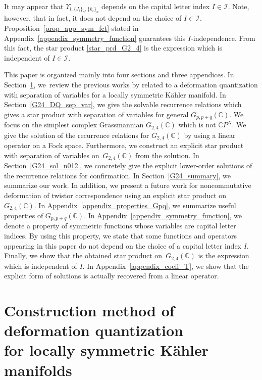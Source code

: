 \documentclass[pdftex]{sigma}
\numberwithin{equation}{section}
\begin{document}
It may appear that
$\Upsilon_{l,\{J_{i}\}_{n},\{k_{i}\}_{n}}$
depends on the capital letter index $I\in\mathcal{I}$. Note, however, that in fact, it does not depend on the choice of $I\in\mathcal{I}$. Proposition~\ref{prop_app_sym_fct} stated in Appendix~\ref{appendix_symmetry_function} guarantees this $I$-independence. From this fact, the star product \eqref{star_prd_G2_4} is the expression which is independent of $I\in\mathcal{I}$.

This paper is organized mainly into four sections and three appendices. In Section~\ref{G24_review}, we~review the previous works by
\cite{HS1,HS2} related to a deformation quantization with separation of variables for a locally symmetric K\"ahler manifold. In Section~\ref{G24_DQ_sep_var}, we give the solvable recurrence relations which gives a star product with separation of variables for general $G_{p,p+q}(\mathbb{C})$. We focus on the simplest complex Grassmannian $G_{2,4}(\mathbb{C})$ which is not $\mathbb{C}P^{N}$. We give the solution of the recurrence relations for $G_{2,4}(\mathbb{C})$ by using a linear operator on a Fock space. Furthermore, we construct an explicit star product with separation of variables on~$G_{2,4}(\mathbb{C})$ from the solution. In Section~\ref{G24_sol_n012}, we concretely give the explicit lower-order solutions of the recurrence relations for confirmation. In Section~\ref{G24_summary}, we summarize our work. In addition, we present a future work for noncommutative deformation of twistor correspondence using an explicit star product on~$G_{2,4}(\mathbb{C})$.
In Appendix~\ref{appendix_properties_Gpq}, we summarize useful properties of $G_{p,p+q}(\mathbb{C})$. In Appendix~\ref{appendix_symmetry_function}, we denote a property of symmetric functions whose variables are capital letter indices. By using this property, we state that some functions and operators appearing in this paper do not depend on the choice of a capital letter index $I$. Finally, we show that the obtained star product on~$G_{2,4}(\mathbb{C})$ is the expression which is independent of $I$. In Appendix~\ref{appendix_coeff_T}, we show that the explicit form of solutions is actually recovered from a linear operator.


\section[Construction method of deformation quantization for locally symmetric Kahler manifolds]{Construction method of deformation quantization\\ for locally symmetric K\"ahler manifolds}
\label{G24_review}
\end{document}
